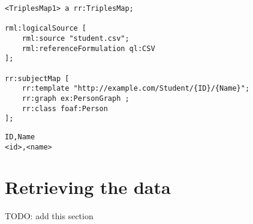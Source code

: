 \begin{lstlisting}[caption={Example mapping for a CSV file}, label={lst:csv_file_mapping}, captionpos=b, basicstyle=\small]
<TriplesMap1> a rr:TriplesMap;

rml:logicalSource [ 
    rml:source "student.csv";
    rml:referenceFormulation ql:CSV
];

rr:subjectMap [ 
    rr:template "http://example.com/Student/{ID}/{Name}";
    rr:graph ex:PersonGraph ;
    rr:class foaf:Person
];
\end{lstlisting}

\begin{lstlisting}[caption={Example CSV template}, label={lst:csv_file}, captionpos=b, basicstyle=\small]
ID,Name
<id>,<name>
\end{lstlisting}

\section{Retrieving the data}
TODO: add this section
